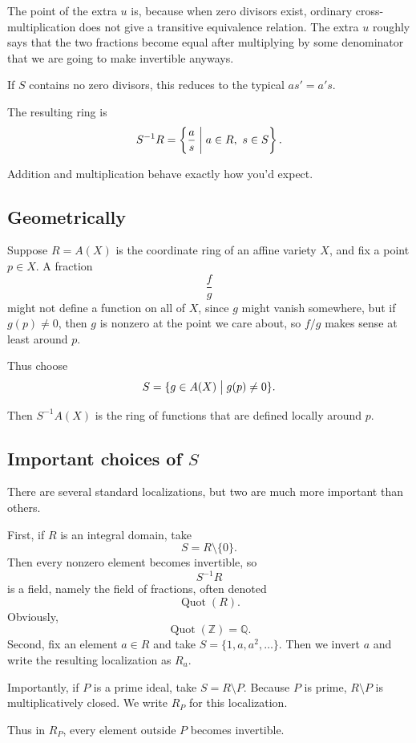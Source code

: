 \documentclass[11pt]{article}
\begin{document}
The point of the extra $u$ is, because when zero 
divisors exist, ordinary cross-multiplication does 
not give a transitive equivalence relation. The extra $u$ 
roughly says that the two fractions become equal 
after multiplying by some denominator that 
we are going to make invertible anyways. 

If $S$ contains no zero divisors, this reduces 
to the typical $as' = a's$. 

The resulting ring is 
\[
    S^{-1}R = \left\{\frac{a}{s} \biggm| a \in R, \
     s \in S\right\}.
\]

Addition and multiplication behave exactly how you'd expect. 

\subsection{Geometrically} 

Suppose $R = A(X)$ is the coordinate ring 
of an affine variety $X$, and fix a point $p \in X$. 
A fraction 
\[
    \frac{f}{g}
\]
might not define a function on all of $X$, since 
$g$ might vanish somewhere, but if $g(p) \neq 0$, 
then $g$ is nonzero at the point we care 
about, so $f/g$ makes sense at least around $p$. 

Thus choose 
\[
    S = \{g \in A(X) \bigm| g(p) \neq 0\}. 
\]

Then $S^{-1}A(X)$ is the ring of functions that 
are defined locally around $p$. 

\subsection{Important choices of $S$}

There are several standard localizations, but two 
are much more important than others. 

First, if $R$ is an integral domain, take 
\[
    S = R \setminus \{0\}. 
\]
Then every nonzero element becomes invertible, so 
\[
    S^{-1}R 
\]
is a field, namely the field of fractions, 
often denoted 
\[
    \operatorname{Quot}(R). 
\]
Obviously, 
\[
    \operatorname{Quot}(\mathbb Z) 
    = \mathbb Q. 
\]
Second, fix an element $a \in R$ and take 
$S = \{1,a,a^2,\ldots\}$. Then we invert $a$ and write 
the resulting localization as $R_a$. 

Importantly, if $P$ is a prime ideal, take $S = R\setminus P$. 
Because $P$ is prime, $R\setminus P$ is multiplicatively closed. 
We write $R_P$ for this localization. 

Thus in $R_P$, every element outside $P$ becomes 
invertible. 
\end{document}
